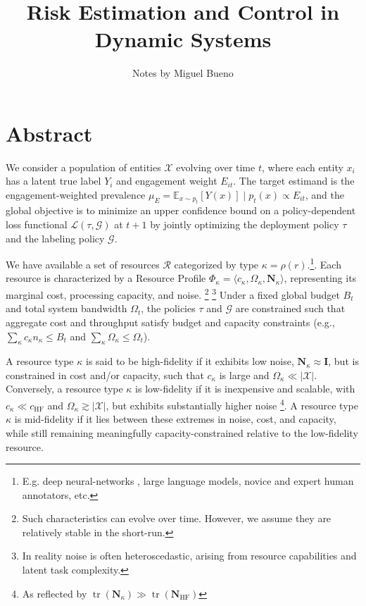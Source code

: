 \documentclass[12pt]{article}
\begin{document}
\title{Risk Estimation and Control in Dynamic Systems}
\author{Notes by Miguel Bueno}
\maketitle

\newpage

\section{Abstract}

We consider a population of entities $\mathcal{X}$ evolving over time $t$, where each entity $x_i$ has a latent true label $Y_i$ and engagement weight $E_{it}$. The target estimand is the engagement-weighted prevalence $\mu_E = \mathbb{E}_{x \sim p_t}[Y(x)] \mid  p_t(x) \propto E_{it}$, and the global objective is to minimize an upper confidence bound on a policy-dependent loss functional $\mathcal{L}(\tau,\mathcal{G})$ at $t+1$ by jointly optimizing the deployment policy $\tau$ and the labeling policy $\mathcal{G}$.

We have available a set of resources $\mathcal{R}$ categorized by type $\kappa = \rho(r)$.\footnote{E.g. deep neural-networks , large language models, novice and expert human annotators, etc.}. Each resource is characterized by a Resource Profile $\Phi_\kappa = \langle c_\kappa, \Omega_\kappa, \mathbf{N}_\kappa \rangle$, representing its marginal cost, processing capacity, and noise. \footnote{Such characteristics can evolve over time. However, we assume they are relatively stable in the short-run.} \footnote{In reality noise is often heteroscedastic, arising from resource capabilities and latent task complexity.} Under a fixed global budget $B_t$ and total system bandwidth $\Omega_t$, the policies $\tau$ and $\mathcal{G}$ are constrained such that aggregate cost and throughput satisfy budget and capacity constraints (e.g., $\sum_{\kappa} c_\kappa n_\kappa \leq B_t$ and $\sum_{\kappa} \Omega_\kappa \leq \Omega_t$). 

A resource type $\kappa$ is said to be high-fidelity if it exhibits low noise, $\mathbf{N}_{\kappa} \approx \mathbf{I}$, but is constrained in cost and/or capacity, such that $c_{\kappa}$ is large and $\Omega_\kappa \ll |\mathcal{X}|$. Conversely, a resource type $\kappa$ is low-fidelity if it is inexpensive and scalable, with $c_\kappa \ll c_{\mathrm{HF}}$ and $\Omega_\kappa \gtrsim |\mathcal{X}|$, but exhibits substantially higher noise \footnote{As reflected by $\operatorname{tr}(\mathbf{N}_\kappa) \gg \operatorname{tr}(\mathbf{N}_{\mathrm{HF}})$}. A resource type $\kappa$ is mid-fidelity if it lies between these extremes in noise, cost, and capacity, while still remaining meaningfully capacity-constrained relative to the low-fidelity resource.
\end{document}
